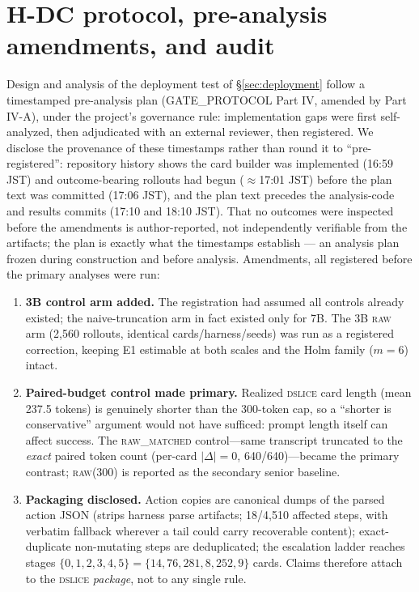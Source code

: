 \section{H-DC protocol, pre-analysis amendments, and audit}
\label{app:hdc}

Design and analysis of the deployment test of \S\ref{sec:deployment} follow a timestamped pre-analysis plan (GATE\_PROTOCOL Part IV, amended by Part IV-A), under the project's governance rule: implementation gaps were first self-analyzed, then adjudicated with an external reviewer, then registered. We disclose the provenance of these timestamps rather than round it to ``pre-registered'': repository history shows the card builder was implemented (16:59 JST) and outcome-bearing rollouts had begun ($\approx$17:01 JST) before the plan text was committed (17:06 JST), and the plan text precedes the analysis-code and results commits (17:10 and 18:10 JST). That no outcomes were inspected before the amendments is author-reported, not independently verifiable from the artifacts; the plan is exactly what the timestamps establish --- an analysis plan frozen during construction and before analysis. Amendments, all registered before the primary analyses were run:
\begin{enumerate}[leftmargin=1.8em]
  \item \textbf{3B control arm added.} The registration had assumed all controls already existed; the naive-truncation arm in fact existed only for 7B. The 3B \textsc{raw} arm (2{,}560 rollouts, identical cards/harness/seeds) was run as a registered correction, keeping E1 estimable at both scales and the Holm family ($m=6$) intact.
  \item \textbf{Paired-budget control made primary.} Realized \textsc{dslice} card length (mean 237.5 tokens) is genuinely shorter than the 300-token cap, so a ``shorter is conservative'' argument would not have sufficed: prompt length itself can affect success. The \textsc{raw\_matched} control---same transcript truncated to the \emph{exact} paired token count (per-card $|\Delta|=0$, 640/640)---became the primary contrast; \textsc{raw(300)} is reported as the secondary senior baseline.
  \item \textbf{Packaging disclosed.} Action copies are canonical dumps of the parsed action JSON (strips harness parse artifacts; 18/4{,}510 affected steps, with verbatim fallback wherever a tail could carry recoverable content); exact-duplicate non-mutating steps are deduplicated; the escalation ladder reaches stages $\{0,1,2,3,4,5\}=\{14,76,281,8,252,9\}$ cards. Claims therefore attach to the \textsc{dslice} \emph{package}, not to any single rule.
\end{enumerate}
